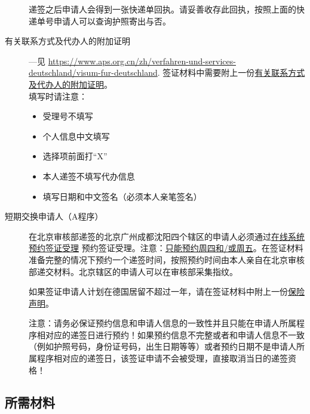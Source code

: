 \documentclass{article}
\begin{document}
\begin{description}
递签之后申请人会得到一张快递单回执。请妥善收存此回执，按照上面的快递单号申请人可以查询护照寄出与否。
\item[有关联系方式及代办人的附加证明\label{inline-additional-proof}] ---见 \url{https://www.aps.org.cn/zh/verfahren-und-services-deutschland/visum-fur-deutschland}.
签证材料中需要附上一份\href{https://china.diplo.de/blob/1341728/895a5533a3c35c4fd2fbc21e92d6dfa3/pdf-formular-zusatzerklaerung-erreichbarkeit-data.pdf}{有关联系方式及代办人的附加证明}。\\
填写时请注意：
\begin{itemize}
  \item 受理号不填写
  \item 个人信息中文填写
  \item 选择项前面打“X”
  \item 本人递签不填写代办信息
  \item 填写日期和中文签名（必须本人亲笔签名）
\end{itemize}
\item[短期交换申请人（A程序）]
在北京审核部递签的北京广州成都沈阳四个辖区的申请人必须通过\href{https://service2.diplo.de/rktermin/extern/choose_category.do?locationCode=peki&realmId=12&categoryId=156&request_locale=de}{在线系统预约签证受理} 预约签证受理。注意：\underline{只能预约周四和/或周五}。在签证材料准备完整的情况下预约一个递签时间，按照预约时间由本人亲自在北京审核部递交材料。北京辖区的申请人可以在审核部采集指纹。

如果签证申请人计划在德国居留不超过一年，请在签证材料中附上一份\href{https://www.aps.org.cn/wp-content/uploads/Belehrung_KV.pdf}{保险声明}。

注意：请务必保证预约信息和申请人信息的一致性并且只能在申请人所属程序相对应的递签日进行预约！如果预约信息不完整或者和申请人信息不一致（例如护照号码，身份证号码，出生日期等等）或者预约日期不是申请人所属程序相对应的递签日，该签证申请不会被受理，直接取消当日的递签资格！
\end{description}

\subsection{所需材料}
\end{document}
